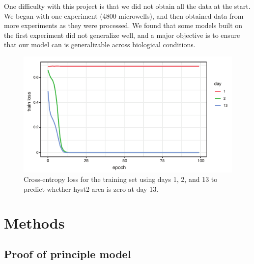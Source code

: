 \documentclass[10pt,twocolumn,letterpaper]{article}
\begin{document}
One difficulty with this project is that we did not obtain all the data at the start.  We began with one experiment (4800 microwells), and then obtained data from more experiments as they were processed.   We found that some models built on the first experiment did not generalize well, and a major objective is to ensure that our model can is generalizable across biological conditions.

 \begin{figure}[b!]
\begin{center}
 \includegraphics[width=0.9\linewidth]{figures/day13_train_loss_vs_epoch_vs_day_v2.pdf}
\end{center}
   \caption{Cross-entropy loss for the training set using days 1, 2, and 13 to predict whether hyst2 area is zero at day 13.}
\label{train_loss_day_1_2_13}
\end{figure}




 \section{Methods}
 
 \subsection{Proof of principle model}
 \label{proof_of_principle}
 
\end{document}

